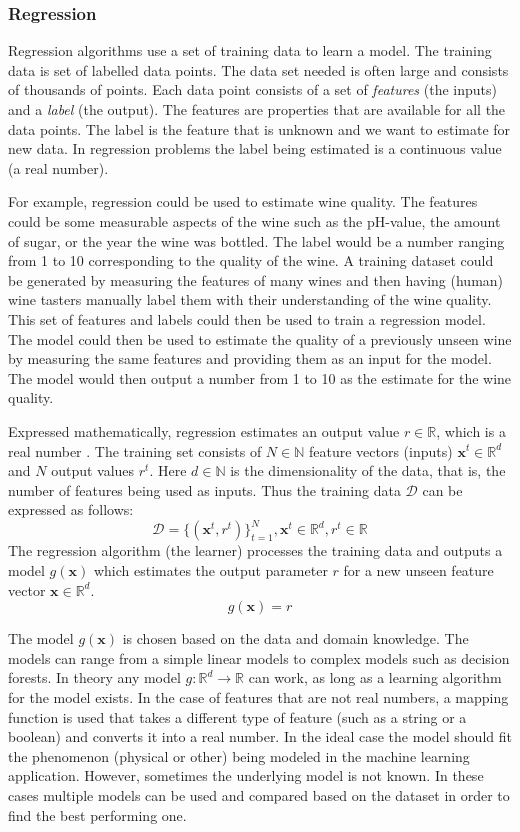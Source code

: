 \subsubsection{Regression}

Regression algorithms use a set of training data to learn a model.
The training data is set of labelled data points.
The data set needed is often large and consists of thousands of points.
Each data point consists of a set of \emph{features} (the inputs) and a \emph{label} (the output).
The features are properties that are available for all the data points.
The label is the feature that is unknown and we want to estimate for new data.
In regression problems the label being estimated is a continuous value (a real number).

For example, regression could be used to estimate wine quality.
The features could be some measurable aspects of the wine such as the pH-value, the amount of sugar, or the year the wine was bottled.
The label would be a number ranging from 1 to 10 corresponding to the quality of the wine.
A training dataset could be generated by measuring the features of many wines and then having (human) wine tasters manually label them with their understanding of the wine quality.
This set of features and labels could then be used to train a regression model.
The model could then be used to estimate the quality of a previously unseen wine by measuring the same features and providing them as an input for the model.
The model would then output a number from 1 to 10 as the estimate for the wine quality.

Expressed mathematically, regression estimates an output value $r \in \mathbb{R}$, which is a real number \cite{alpaydin}.
The training set consists of $N \in \mathbb{N}$ feature vectors (inputs) $\mathbf{x}^t \in \mathbb{R}^d$ and $N$ output values $r^t$.
Here $d \in \mathbb{N}$ is the dimensionality of the data, that is, the number of features being used as inputs. Thus the training data $\mathcal{D}$ can be expressed as follows:
$$\mathcal{D} = \{(\mathbf{x}^t, r^t)\}_{t=1}^N, \mathbf{x}^t \in \mathbb{R}^d, r^t \in \mathbb{R}$$
The regression algorithm (the learner) processes the training data and outputs a model $g(\mathbf{x})$ which estimates the output parameter $r$ for a new unseen feature vector $\mathbf{x} \in \mathbb{R}^d$.
$$g(\mathbf{x}) = r$$

The model $g(\mathbf{x})$ is chosen based on the data and domain knowledge. 
The models can range from a simple linear models to complex models such as decision forests.
In theory any model $g: \mathbb{R}^d \rightarrow \mathbb{R}$ can work,
as long as a learning algorithm for the model exists.
In the case of features that are not real numbers, a mapping function is used that takes a different type of feature (such as a string or a boolean) and converts it into a real number.
In the ideal case the model should fit the phenomenon (physical or other) being modeled in the machine learning application.
However, sometimes the underlying model is not known. 
In these cases multiple models can be used and compared based on the dataset in order to find the best performing one.

